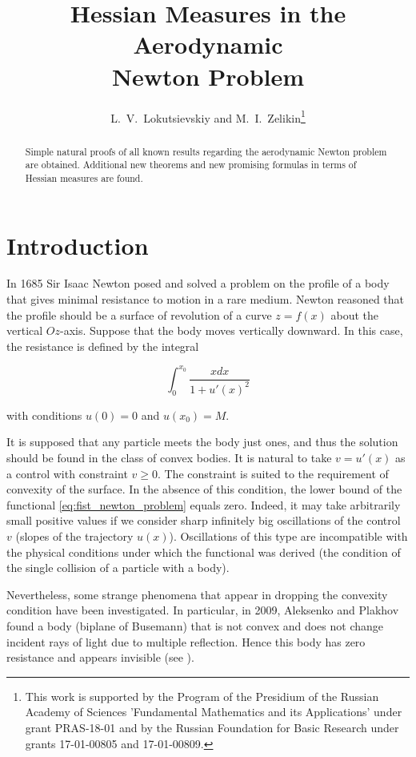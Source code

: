 \documentclass[14pt]{extarticle}
\title{Hessian Measures in the Aerodynamic\\Newton Problem}
\author{L.~V.~Lokutsievskiy and M.~I.~Zelikin\footnote{This work is supported by the Program of the Presidium of the Russian Academy of Sciences \ftextnumero 01 'Fundamental Mathematics and its Applications' under grant PRAS-18-01 and by the Russian Foundation for Basic Research under grants 17-01-00805 and 17-01-00809.}}
\date{}
\theoremstyle{remark}
\theoremstyle{definition}
\begin{document}
\maketitle

\begin{abstract}
    Simple natural proofs of all known results regarding the aerodynamic Newton problem are obtained. Additional new theorems and new promising formulas in terms of Hessian measures are found.
\end{abstract}



\section{Introduction}

In 1685 Sir Isaac Newton posed and solved a problem on the profile of a body that gives minimal resistance to motion in a rare medium. Newton reasoned that the profile should be a surface of revolution of a curve $z=f(x)$ about the vertical $Oz$-axis. Suppose that the body moves vertically downward. In this case, the resistance is defined by the integral       

\begin{equation}
	\label{eq:fist_newton_problem}
	\int_0^{x_0}\frac {xdx}{1 + u'(x)^2}
\end{equation}

\noindent with conditions $u(0)=0$ and $u(x_0)=M$.

It is supposed that any particle meets the body just ones, and thus the solution should be found in the class of convex bodies. It is natural to take $v=u'(x)$ as a control with constraint $v \geq 0$. The constraint is suited to the requirement of convexity of the surface. In the absence of this condition, the lower bound of the functional \eqref{eq:fist_newton_problem} equals zero. Indeed, it may take arbitrarily small positive values if we consider sharp infinitely big oscillations of the control $v$ (slopes of the trajectory $u(x)$). Oscillations of this type are incompatible with the physical conditions under which the functional was derived (the condition of the single collision of a particle with a body).

Nevertheless, some strange phenomena that appear in dropping the convexity condition have been investigated. In particular, in 2009, Aleksenko and Plakhov found a body (biplane of Busemann) that is not convex and does not change incident rays of light due to multiple reflection. Hence this body has zero resistance and appears invisible (see \cite{Plakhov}). 
\end{document}

